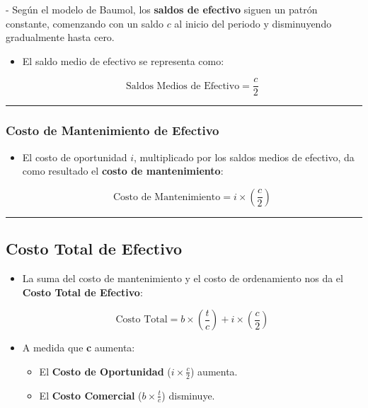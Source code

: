 \documentclass[
  letterpaper,
  DIV=11,
  numbers=noendperiod]{scrartcl}
\providecommand{\tightlist}{%
  \setlength{\itemsep}{0pt}\setlength{\parskip}{0pt}}\usepackage{longtable,booktabs,array}
\begin{document}
- Según el modelo de Baumol, los \textbf{saldos de efectivo} siguen un
patrón constante, comenzando con un saldo \(c\) al inicio del periodo y
disminuyendo gradualmente hasta cero.

\begin{itemize}
\item
  El saldo medio de efectivo se representa como:

  \[ 
  \text{Saldos Medios de Efectivo} = \frac{c}{2}
  \]
\end{itemize}

\begin{center}\rule{0.5\linewidth}{0.5pt}\end{center}

\subsubsection{Costo de Mantenimiento de
Efectivo}\label{costo-de-mantenimiento-de-efectivo}

\begin{itemize}
\item
  El costo de oportunidad \(i\), multiplicado por los saldos medios de
  efectivo, da como resultado el \textbf{costo de mantenimiento}:

  \[ 
  \text{Costo de Mantenimiento} = i \times \left( \frac{c}{2} \right)
  \]
\end{itemize}

\begin{center}\rule{0.5\linewidth}{0.5pt}\end{center}

\subsection{Costo Total de Efectivo}\label{costo-total-de-efectivo}

\begin{itemize}
\item
  La suma del costo de mantenimiento y el costo de ordenamiento nos da
  el \textbf{Costo Total de Efectivo}:

  \[ 
  \text{Costo Total} = b \times \left( \frac{t}{c} \right) + i \times \left( \frac{c}{2} \right)
  \]
\item
  A medida que \textbf{c} aumenta:

  \begin{itemize}
  \tightlist
  \item
    El \textbf{Costo de Oportunidad} (\(i \times \frac{c}{2}\)) aumenta.
  \item
    El \textbf{Costo Comercial} (\(b \times \frac{t}{c}\)) disminuye.
  \end{itemize}
\end{itemize}
\end{document}
